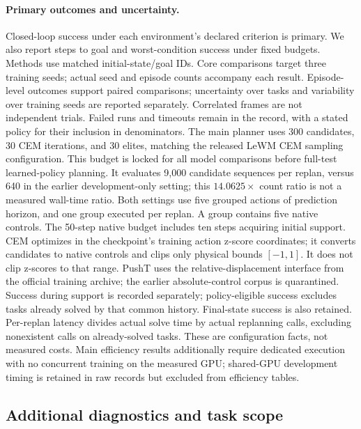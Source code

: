 \paragraph{Primary outcomes and uncertainty.}
Closed-loop success under each environment's declared criterion is primary.
We also report steps to goal and worst-condition success under fixed budgets.
Methods use matched initial-state/goal IDs. Core comparisons target three
training seeds; actual seed and episode counts accompany each result.
Episode-level outcomes support paired comparisons; uncertainty over tasks
and variability over training seeds are reported separately. Correlated
frames are not independent trials. Failed runs and timeouts remain in the
record, with a stated policy for their inclusion in denominators.
The main planner uses 300 candidates, 30 CEM iterations, and 30 elites,
matching the released LeWM CEM sampling configuration. This budget is
locked for all model comparisons before full-test learned-policy planning.
It evaluates 9,000 candidate sequences per replan, versus 640 in the
earlier development-only setting; this $14.0625\times$ count ratio is not
a measured wall-time ratio. Both settings use
five grouped actions of prediction horizon, and one group executed per replan.
A group contains five native controls. The 50-step native budget includes
ten steps acquiring initial support. CEM optimizes in the checkpoint's
training action z-score coordinates; it converts candidates to native controls
and clips only physical bounds $[-1,1]$. It does not clip z-scores to that
range. PushT uses the relative-displacement interface from the official
training archive; the earlier absolute-control corpus is quarantined.
Success during support is recorded
separately; policy-eligible success excludes tasks already solved by that
common history. Final-state success is also retained. Per-replan latency
divides actual solve time by actual replanning calls, excluding nonexistent
calls on already-solved tasks. These are configuration facts, not measured costs.
Main efficiency results additionally require dedicated execution with no
concurrent training on the measured GPU; shared-GPU development timing is
retained in raw records but excluded from efficiency tables.

\subsection{Additional diagnostics and task scope}
